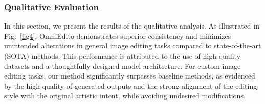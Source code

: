 \subsubsection{Qualitative Evaluation}

In this section, we present the results of the qualitative analysis. As illustrated in Fig.~\ref{fig4}, OmniEdito demonstrates superior consistency and minimizes unintended alterations in general image editing tasks compared to state-of-the-art (SOTA) methods. This performance is attributed to the use of high-quality datasets and a thoughtfully designed model architecture. For custom image editing tasks, our method significantly surpasses baseline methods, as evidenced by the high quality of generated outputs and the strong alignment of the editing style with the original artistic intent, while avoiding undesired modifications.





